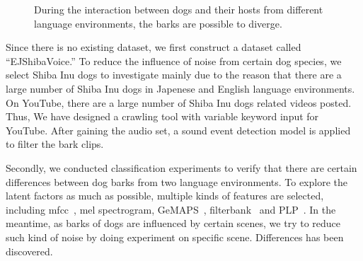 
\begin{figure}[t]
	\centering
	\caption{During the interaction between dogs and their hosts from different language environments, the barks are possible to diverge.}
	\label{fig:intropic}
\end{figure}


Since there is no existing dataset, we first construct a dataset called ``EJShibaVoice.'' To reduce the influence of noise from certain dog species, we select Shiba Inu dogs to investigate mainly due to the reason that there are a large number of Shiba Inu dogs in Japenese and English language environments. On YouTube, there are a large number of Shiba Inu dogs related videos posted. Thus, We have designed a crawling tool with variable keyword input for YouTube. After gaining the audio set, a sound event detection model is applied to filter the bark clips.

Secondly, we conducted classification experiments to verify that there are certain differences between dog barks from two language environments. To explore the latent factors as much as possible, multiple kinds of features are selected, including mfcc~\cite{davis1980comparison}, mel spectrogram, GeMAPS~\cite{eyben2015geneva}, filterbank~\cite{strang1996wavelets} and PLP~\cite{hermansky1990perceptual}. In the meantime, as barks of dogs are influenced by certain scenes, we try to reduce such kind of noise by doing experiment on specific scene. Differences has been discovered.

